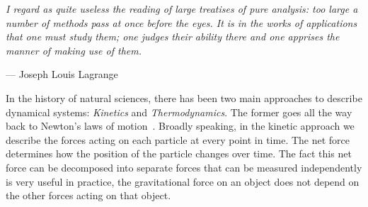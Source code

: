 

\newcommand{\epigraph}[3]{
\vspace{1em}\hfill{}\begin{minipage}{#1}{\begin{spacing}{0.9}
\small\noindent\textit{#2}\end{spacing}
\vspace{1em}
\hfill{}{#3}}\vspace{2em}
\end{minipage}}
\epigraph{.8\textwidth}{
  I regard as quite useless the reading of
  large treatises of pure analysis:
  too large a number of methods pass at once before the eyes.
  It is in the works of applications that one must study them;
  one judges their ability there and
  one apprises the manner of making use of them.}{
  --- Joseph Louis Lagrange}

\noindent
In the history of natural sciences,
there has been two main approaches to describe dynamical systems:
\emph{Kinetics} and \emph{Thermodynamics}.
The former goes all the way back to
Newton's laws of motion~\citep{newton}.
Broadly speaking, in the kinetic approach we describe the forces
acting on each particle at every point in time.
The net force determines how
the position of the particle changes over time.
The fact this net force can be decomposed into separate forces
that can be measured independently is very useful in practice,
\eg the gravitational force on an object does not depend on
the other forces acting on that object.

